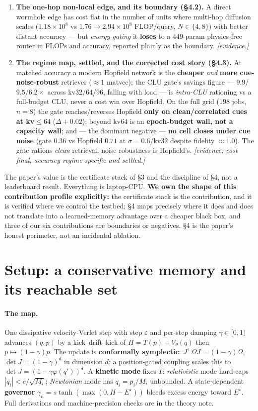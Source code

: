 \documentclass[11pt]{article}
\newcommand{\detJ}{\det J}
\begin{document}
\begin{enumerate}
\item \textbf{The one-hop non-local edge, and its boundary (\S4.2).} A direct wormhole edge has cost flat in the number of units where multi-hop diffusion scales ($1.18{\times}10^8$ vs $1.76{\to}2.94{\times}10^8$ FLOP/query, $N\in\{4,8\}$) with better distant accuracy --- but \emph{energy-gating} it \textbf{loses} to a $449$-param physics-free router in FLOPs and accuracy, reported plainly as the boundary. \emph{[evidence.]}
\item \textbf{The regime map, settled, and the corrected cost story (\S4.3).} At matched accuracy a modern Hopfield network is the \textbf{cheaper} \emph{and} \textbf{more cue-noise-robust} retriever ($\approx1$ matvec); the CLU gate's savings figure --- $9.9$/$9.5$/$6.2\times$ across kv$32$/$64$/$96$, falling with load --- is \emph{intra-CLU} rationing vs a full-budget CLU, never a cost win over Hopfield. On the full grid ($198$ jobs, $n=8$) the gate reaches/reverses Hopfield \textbf{only on clean/correlated cues at kv$\le64$} ($\Delta+0.02$); beyond kv$64$ is an \textbf{epoch-budget wall, not a capacity wall}; and --- the dominant negative --- \textbf{no cell closes under cue noise} (gate $0.36$ vs Hopfield $0.71$ at $\sigma{=}0.6$/kv$32$ despite fidelity $\approx1.0$). The gate rations \emph{clean} retrieval; noise-robustness is Hopfield's. \emph{[evidence; cost final, accuracy regime-specific and settled.]}
\end{enumerate}
The paper's value is the certificate stack of \S3 and the discipline of \S4, not a leaderboard result. Everything is laptop-CPU. \textbf{We own the shape of this contribution profile explicitly:} the certificate stack is the contribution, and it is verified where we control the testbed; \S4 maps precisely where it does and does not translate into a learned-memory advantage over a cheaper black box, and three of our six contributions are boundaries or negatives. \S4 is the paper's honest perimeter, not an incidental ablation.

\section{Setup: a conservative memory and its reachable set}
\paragraph{The map.} One dissipative velocity-Verlet step with step $\varepsilon$ and per-step damping $\gamma\in[0,1)$ advances $(q,p)$ by a kick--drift--kick of $H=T(p)+V_\theta(q)$ then $p\mapsto(1-\gamma)p$. The update is \textbf{conformally symplectic}: $J^\top\Omega J=(1-\gamma)\Omega$, $\detJ=(1-\gamma)^d$ in dimension $d$; a position-gated coupling scales this to $\detJ=(1-\gamma\varphi(q'))^d$. A \textbf{kinetic mode} fixes $T$: \emph{relativistic} mode hard-caps $|\dot q_i|<c/\sqrt{M_i}$; \emph{Newtonian} mode has $\dot q_i=p_i/M_i$ unbounded. A state-dependent \textbf{governor} $\gamma_n=s\tanh(\max(0,H-E^\star))$ bleeds excess energy toward $E^\star$. Full derivations and machine-precision checks are in the theory note.
\end{document}
